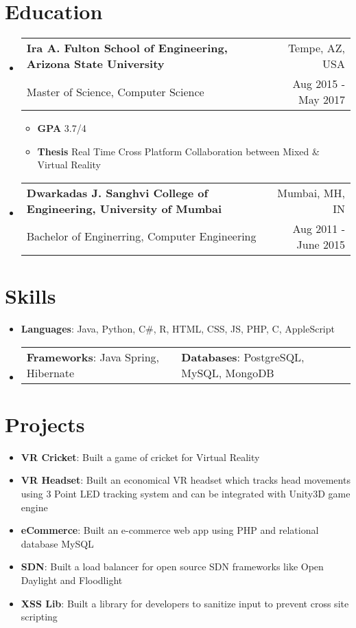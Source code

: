 \documentclass[a4paper,12pt]{article} %
\makeatletter
\newcommand{\fourElementListStart}{\begin{itemize}[label={},leftmargin=*]\setlength\itemsep{1em}}
\newcommand{\fourElementListEnd}{\end{itemize}}
\newcommand{\generalListStart}{\begin{itemize}[leftmargin=2em]\setlength\itemsep{0.02em}}
\newcommand{\generalListEnd}{\end{itemize}}
\newcommand{\fourElementItem}[4]{
	\vspace{-0.5em}\item
		\begin{tabular*}{\textwidth}{@{}l@{\extracolsep{\fill}}r@{}}
			\textbf{#1} & {\small{#2}} \\[0.2em]
			{#3} & {\small{#4}} \\[0.2em]
		\end{tabular*}\vspace{-0.7em}
}
\newcommand{\twoKeyValuePairElementItem}[4]{
	\vspace{-1em}\item
		\begin{tabular}{@{}p{7cm}p{11cm}}

			\vspace{0.5em}\textbf{#1}{: #2} & \vspace{0.5em}\textbf{#3}{: #4}

		\end{tabular}\vspace{-1.2em}
}
\newcommand{\oneKeyValuePairElement}[2]{
	\item \textbf{#1}{: #2}
}
\makeatother
\begin{document}

\vspace{1em}\section*{Education}

\fourElementListStart
	\fourElementItem {Ira A. Fulton School of Engineering, Arizona State University}{Tempe, AZ, USA}
	{Master of Science, Computer Science}{Aug 2015 - May 2017}
	\generalListStart
		\item \textbf{GPA} 3.7/4
		\item \textbf{Thesis} Real Time Cross Platform Collaboration between Mixed \& Virtual Reality
	\generalListEnd
	\vspace{-0.5em}\fourElementItem {Dwarkadas J. Sanghvi College of Engineering, University of Mumbai}{Mumbai, MH, IN}
	{Bachelor of Enginerring, Computer Engineering}{Aug 2011 - June 2015}
\fourElementListEnd


\vspace{1em}\section*{Skills}

\generalListStart
	\oneKeyValuePairElement{Languages}{Java, Python, C\#, R, HTML, CSS, JS, PHP, C, AppleScript}
	\twoKeyValuePairElementItem{Frameworks}{Java Spring, Hibernate}{Databases}{PostgreSQL, MySQL, MongoDB}
\generalListEnd


\vspace{0.5em}\section*{Projects}
\generalListStart
	\oneKeyValuePairElement{VR Cricket}{Built a game of cricket for Virtual Reality}
	\oneKeyValuePairElement{VR Headset}{Built an economical VR headset which tracks head movements using 3 Point LED tracking system and can be integrated with Unity3D game engine}
	\oneKeyValuePairElement{eCommerce}{Built an e-commerce web app using PHP and relational database MySQL}
	\oneKeyValuePairElement{SDN}{Built a load balancer for open source SDN frameworks like Open Daylight and Floodlight}
	\oneKeyValuePairElement{XSS Lib}{Built a library for developers to sanitize input to prevent cross site scripting}
\generalListEnd
\end{document}
